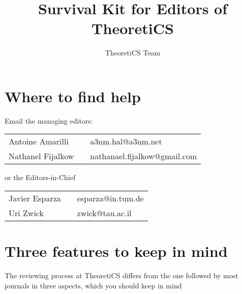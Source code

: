 \documentclass[runningheads]{llncs}
\begin{document}
%
\setlength{\parindent}{0em}
\setlength{\parskip}{0.8em}
%
\title{Survival Kit for Editors of TheoretiCS}
%
%
\author{TheoretiCS Team}
%
%
\institute{
}
%
\maketitle              %

%


\section{Where to find help}

Email the managing editors:

\begin{center}
\begin{tabular}{lll}
Antoine Amarilli 	& \qquad \qquad & a3nm.hal@a3nm.net  \\
Nathanel Fijalkow &         & nathanael.fijalkow@gmail.com 
\end{tabular}
\end{center}

\noindent or the Editors-in-Chief

\begin{center}
\begin{tabular}{lll}
Javier Esparza	&\qquad \qquad &esparza@in.tum.de \\
Uri Zwick	&	& zwick@tau.ac.il
\end{tabular}
\end{center}

\section{Three features to keep in mind}
\label{sec:term}

The reviewing process at TheoretiCS differs from the one followed
by most journals in three aspects, which you should keep in mind
\end{document}
